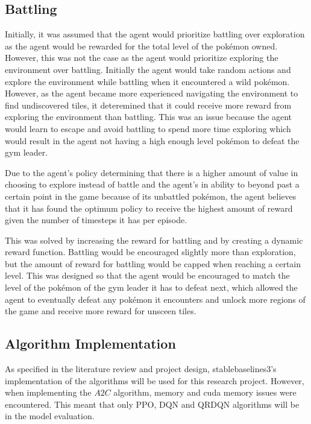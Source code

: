 \subsection{Battling}

Initially, it was assumed that the agent would prioritize battling over exploration as the agent would be rewarded for the total level of the pokémon owned. However, this was not the case as the agent would prioritize exploring the environment over battling. Initially the agent would take random actions and explore the environment while battling when it encountered a wild pokémon. However, as the agent became more experienced navigating the environment to find undiscovered tiles, it deteremined that it could receive more reward from exploring the environment than battling. This was an issue because the agent would learn to escape and avoid battling to spend more time exploring which would result in the agent not having a high enough level pokémon to defeat the gym leader. 

Due to the agent's policy determining that there is a higher amount of value in choosing to explore instead of battle and the agent's in ability to beyond past a certain point in the game because of its unbattled pokémon, the agent believes that it has found the optimum policy to receive the highest amount of reward given the number of timesteps it has per episode. 

This was solved by increasing the reward for battling and by creating a dynamic reward function. Battling would be encouraged slightly more than exploration, but the amount of reward for battling would be capped when reaching a certain level. This was designed so that the agent would be encouraged to match the level of the pokémon of the gym leader it has to defeat next, which allowed the agent to eventually defeat any pokémon it encounters and unlock more regions of the game and receive more reward for unsceen tiles.

\subsection{Algorithm Implementation}

As specified in the literature review and project design, stablebaselines3's implementation of the algorithms will be used for this research project. However, when implementing the $A2C$ algorithm, memory and cuda memory issues were encountered. This meant that only PPO, DQN and QRDQN algorithms will be in the model evaluation. 

